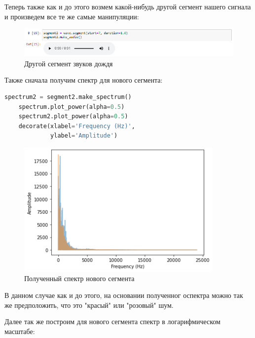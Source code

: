 \documentclass[a4paper]{article}
\begin{document}
            Теперь также как и до этого возмем какой-нибудь другой сегмент нашего сигнала и произведем все те же самые манипуляции:
            
             \begin{figure}[H]
                \centering
                \includegraphics[width=\textwidth]{ex_1_wave_second_segment.png}
                \caption{Другой сегмент звуков дождя}
                \label{fig:ex_1_wave_second_segment}
            \end{figure}
            
            Также сначала получим спектр для нового сегмента:
            
\begin{lstlisting}[language=Python, caption= Получение спектра нового сегмента]
    spectrum2 = segment2.make_spectrum()
    spectrum.plot_power(alpha=0.5)
    spectrum2.plot_power(alpha=0.5)
    decorate(xlabel='Frequency (Hz)',
             ylabel='Amplitude')
\end{lstlisting}               
            
            \begin{figure}[H]
                \centering
                \includegraphics{ex_1_wave_second_spectr.png}
                \caption{Полученный спектр нового сегмента}
                \label{fig:ex_1_rain_spectr}
            \end{figure}
            
            В данном случае как и до этого, на основании полученног оспектра можно так же предположить, что это "красый" или "розовый" шум.
            
            Далее так же построим для нового сегмента спектр в логарифмическом масштабе:
            
\end{document}
